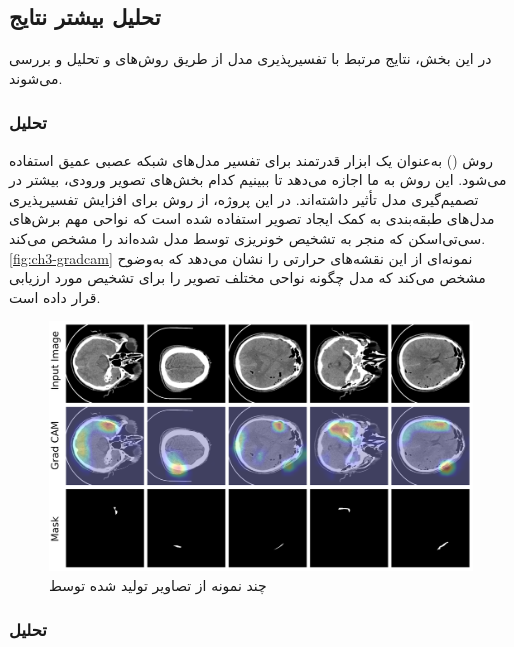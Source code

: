 \subsection{تحلیل بیشتر نتایج}

در این بخش، نتایج مرتبط با تفسیرپذیری مدل  از طریق روش‌های  و  تحلیل و بررسی می‌شوند.

\subsubsection{تحلیل }

روش 
()
 به‌عنوان یک ابزار قدرتمند برای تفسیر مدل‌های شبکه عصبی عمیق استفاده می‌شود. این روش به ما اجازه می‌دهد تا ببینیم کدام بخش‌های تصویر ورودی، بیشتر در تصمیم‌گیری مدل تأثیر داشته‌اند. در این پروژه، از روش
  برای افزایش تفسیرپذیری مدل‌های طبقه‌بندی به کمک ایجاد تصویر استفاده شده است که نواحی مهم برش‌های سی‌تی‌اسکن که منجر به تشخیص خونریزی توسط مدل شده‌اند را مشخص می‌‌کند.  
  \autoref{fig:ch3-gradcam} 
  نمونه‌ای از این نقشه‌های حرارتی را نشان می‌دهد که به‌وضوح مشخص می‌کند که مدل چگونه نواحی مختلف تصویر را برای تشخیص  مورد ارزیابی قرار داده است.
\begin{figure}[h]
\centering
\includegraphics[width=1.0\linewidth]{Images/Chapter3/GradCam}
\caption{چند نمونه از تصاویر تولید شده توسط  }
\label{fig:ch3-gradcam}
\end{figure}

\subsubsection{تحلیل }

